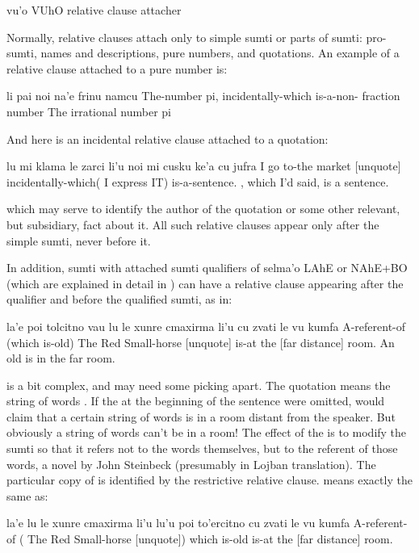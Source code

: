 
   vu'o    VUhO        relative clause attacher

Normally, relative clauses attach only to simple sumti or
    parts of sumti: pro-sumti, names and descriptions, pure
    numbers, and quotations. An example of a relative clause
    attached to a pure number is:
\begin{example}
li pai noi na'e\n
\T	frinu namcu\n
The-number pi, incidentally-which\n
\T	is-a-non- fraction number\n
The irrational number pi
\end{example}

And here is an incidental relative clause attached to a
    quotation:
\begin{example}
lu mi klama le zarci li'u\n
\T	noi mi cusku ke'a cu jufra\n
{} I go to-the market [unquote]\n
\T	incidentally-which( I express IT) is-a-sentence.\n
{}, which I'd said, is a sentence.
\end{example}

{\noindent}which may serve to identify the author of the quotation or some
    other relevant, but subsidiary, fact about it. All such
    relative clauses appear only after the simple sumti, never
    before it. 

In addition, sumti with attached sumti qualifiers of selma'o
    LAhE or NAhE+BO (which are explained in detail in ) can have a relative clause
    appearing after the qualifier and before the qualified sumti,
    as in:
\begin{example}
la'e poi tolcitno vau\n
\T	lu le xunre cmaxirma li'u\n
\T	cu zvati le vu kumfa\n
A-referent-of (which is-old)\n
\T	{} The Red Small-horse [unquote]\n
\T	is-at the [far distance] room.\n
An old  is in the far room.
\end{example}

 is a bit complex, and may need
    some picking apart. The quotation 
    means the string of words . If the  at
    the beginning of the sentence were omitted,  would claim that a certain string
    of words is in a room distant from the speaker. But obviously a
    string of words can't be in a room! The effect of the 
    is to modify the sumti so that it refers not to the words
    themselves, but to the referent of those words, a novel by John
    Steinbeck (presumably in Lojban translation). The particular
    copy of  is identified by the restrictive
    relative clause.  means exactly
    the same as:
\begin{example}
la'e lu le xunre cmaxirma li'u lu'u\n
\T	poi to'ercitno cu zvati le vu kumfa\n
A-referent-of ( The Red Small-horse [unquote])\n
\T	which is-old is-at the [far distance] room.
\end{example}


